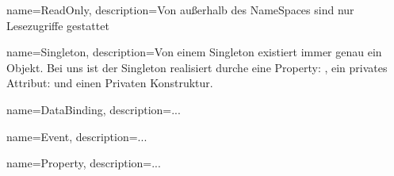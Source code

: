 {
	name=ReadOnly,
	description={Von außerhalb des NameSpaces sind nur Lesezugriffe gestattet}
}

{
	name=Singleton,
	description={Von einem Singleton existiert immer genau ein Objekt.
					Bei uns ist der Singleton realisiert durche eine Property: ,
					ein privates Attribut:  und einen Privaten Konstruktur.}
}

{
	name=DataBinding,
	description={...}
}

{
	name=Event,
	description={...}
}

{
	name=Property,
	description={...}
}

